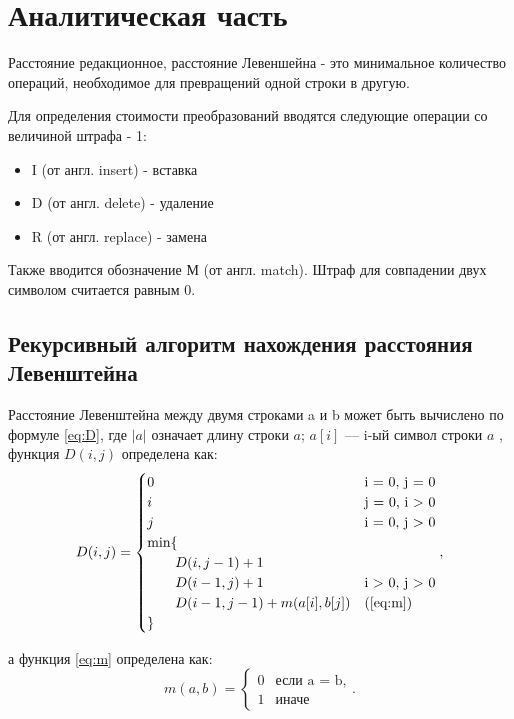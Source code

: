 \chapter{Аналитическая часть}

    Расстояние редакционное, расстояние Левеншейна - это минимальное
    количество операций, необходимое для превращений одной строки в другую.
    
    Для определения стоимости преобразований вводятся следующие операции
    со величиной штрафа - 1:
    
    \begin{itemize}
        \item I (от англ. insert) - вставка
        \item D (от англ. delete) - удаление
        \item R (от англ. replace) - замена
    \end{itemize}
    
    Также вводится обозначение М (от англ. match). Штраф для совпадении двух
    символом считается равным 0.
    
    \section{Рекурсивный алгоритм нахождения расстояния Левенштейна}
        
        Расстояние Левенштейна между двумя строками a и b может быть вычислено по формуле \ref{eq:D}, где $|a|$ означает длину строки $a$; $a[i]$ — i-ый символ строки $a$ , функция $D(i, j)$ определена как:
        \begin{equation}
        	\label{eq:D}
        	D(i, j) = \begin{cases}
        		0 &\text{i = 0, j = 0}\\
        		i &\text{j = 0, i > 0}\\
        		j &\text{i = 0, j > 0}\\
        		\min \lbrace \\
        			\qquad D(i, j-1) + 1\\
        			\qquad D(i-1, j) + 1 &\text{i > 0, j > 0}\\
        			\qquad D(i-1, j-1) + m(a[i], b[j]) &\text(\ref{eq:m})\\
        		\rbrace
        	\end{cases},
        \end{equation}
        
        а функция \ref{eq:m} определена как:
        \begin{equation}
        	\label{eq:m}
        	m(a, b) = \begin{cases}
        		0 &\text{если a = b,}\\
        		1 &\text{иначе}
        	\end{cases}.
        \end{equation}
        
